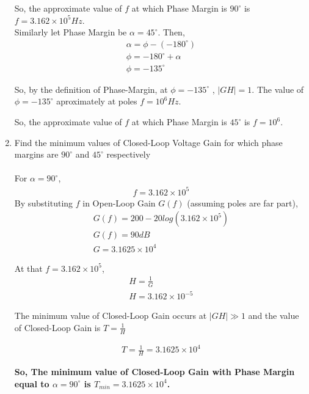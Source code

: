 \begin{enumerate}[label=\thesubsection.\arabic*.,ref=\thesubsection.\theenumi]
So, the approximate value of $f$ at which Phase Margin is $90^{\circ}$ is $f=3.162 \times 10^{5} Hz$.\\

Similarly let Phase Margin be $\alpha = 45^{\circ}$. Then,
\begin{align}
\alpha = \phi - (-180^{\circ})\\
\phi = -180^{\circ} + \alpha\\
\phi = -135^{\circ}
\end{align}

So, by the definition of Phase-Margin, at $\phi = -135^{\circ}$ , $|GH| = 1 $.  The value of $\phi = -135^{\circ}$ aproximately at poles $f=10^{6} Hz$. 

So, the approximate value of $f$ at which Phase Margin is $45^{\circ}$ is $f=10^{6}$.\\

\item Find the minimum values of Closed-Loop Voltage Gain for which phase margins are $90^{\circ}$ and  $45^{\circ}$ respectively\\
\solution\\
For $\alpha=90^{\circ}$,
\begin{align}
f=3.162 \times 10^{5}
\end{align}
By substituting $f$ in Open-Loop Gain $G(f)$ (assuming poles are far part), 
\begin{align}
G(f) = 200 - 20log(3.162 \times 10^{5})\\
G(f) = 90 dB \\
G = 3.1625 \times 10^{4}
\end{align}

At that $f=3.162 \times 10^{5}$, 
\begin{align}
H = \frac{1}{G}\\
H = 3.162 \times 10^{-5}
\end{align}

The minimum value of Closed-Loop Gain occurs at $|GH| \gg 1$ and the value of Closed-Loop Gain is $T=\frac{1}{H}$

\begin{align}
T = \frac{1}{H} = 3.1625 \times 10^{4}
\end{align}

\textbf{So, The minimum value of Closed-Loop Gain with Phase Margin equal to $\alpha=90^{\circ}$ is $T_{min} = 3.1625 \times 10^{4}$.}\\


\end{enumerate}
